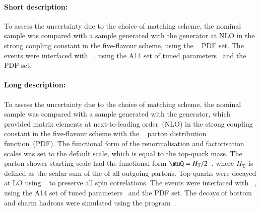 \paragraph{Short description:}

To assess the uncertainty due to the choice of matching scheme, the nominal sample was compared with a sample generated
with the \MGNLO[2.6.2] generator at NLO in the strong coupling constant \alphas in the five-flavour scheme, 
using the \NNPDF[3.0nlo]~\cite{Ball:2014uwa} PDF set.
The events were interfaced with \PYTHIA[8.230]~\cite{Sjostrand:2014zea}, using the A14 set of tuned parameters~\cite{ATL-PHYS-PUB-2014-021} 
and the \NNPDF[2.3lo] PDF set.

\paragraph{Long description:}

To assess the uncertainty due to the choice of matching scheme, the nominal sample was compared with a sample generated
with the \MGNLO[2.6.2] generator, which provided matrix elements at next-to-leading order~(NLO) in the strong coupling constant \alphas
in the five-flavour scheme with the \NNPDF[3.0nlo]~\cite{Ball:2014uwa} parton distribution function~(PDF).
The functional form of the renormalisation and factorisation scales was set to the default scale, which is equal to the top-quark mass.
The parton-shower starting scale had the functional form $\muQ = H_{\mathrm T}/2$~\cite{ATL-PHYS-PUB-2017-007}, 
where $H_{\mathrm T}$ is defined as the scalar sum of the \pT of all outgoing partons.
Top quarks were decayed at LO using \MADSPIN~\cite{Frixione:2007zp,Artoisenet:2012st} to preserve all spin correlations.
The events were interfaced with \PYTHIA[8.230]~\cite{Sjostrand:2014zea}, using the A14 set of tuned parameters~\cite{ATL-PHYS-PUB-2014-021} 
and the \NNPDF[2.3lo] PDF set.
The decays of bottom and charm hadrons were simulated using the \EVTGEN[1.6.0] program~\cite{Lange:2001uf}.
